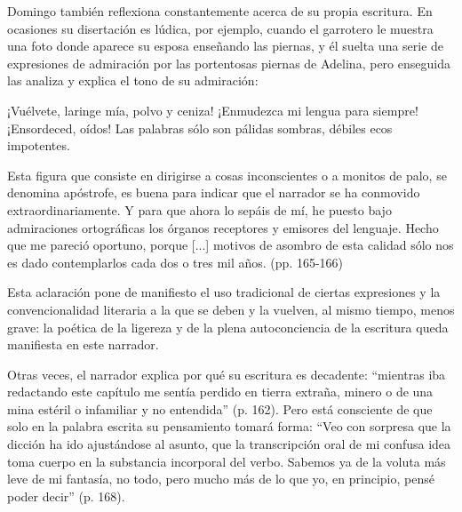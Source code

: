 \documentclass[14pt,twoside,final]{extbook} %
\begin{document}
Domingo también reflexiona constantemente acerca de su propia escritura. En ocasiones su disertación es lúdica, por ejemplo, cuando el garrotero le muestra una foto donde aparece su esposa enseñando las piernas, y él suelta una serie de expresiones de admiración por las portentosas piernas de Adelina, pero enseguida las analiza y explica el tono de su admiración:
\begin{quoting}
¡Vuélvete, laringe mía, polvo y ceniza! ¡Enmudezca mi lengua para siempre! ¡Ensordeced, oídos! Las palabras sólo son pálidas sombras, débiles ecos impotentes.

Esta figura que consiste en dirigirse a cosas inconscientes o a monitos de palo, se denomina apóstrofe, es buena para indicar que el narrador se ha conmovido extraordinariamente. Y para que ahora lo sepáis de mí, he puesto bajo admiraciones ortográficas los órganos receptores y emisores del lenguaje. Hecho que me pareció oportuno, porque [...] motivos de asombro de esta calidad sólo nos es dado contemplarlos cada dos o tres mil años. (pp. 165-166)
\end{quoting}
Esta aclaración pone de manifiesto el uso tradicional de ciertas expresiones y la convencionalidad literaria a la que se deben y la vuelven, al mismo tiempo, menos grave: la poética de la ligereza y de la plena autoconciencia de la escritura queda manifiesta en este narrador.

Otras veces, el narrador explica por qué su escritura es decadente: ``mientras iba redactando este capítulo me sentía perdido en tierra extraña, minero o de una mina estéril o infamiliar y no entendida'' (p. 162). Pero está consciente de que solo en la palabra escrita su pensamiento tomará forma: ``Veo con sorpresa que la dicción ha ido ajustándose al asunto, que la transcripción oral de mi confusa idea toma cuerpo en la substancia incorporal del verbo. Sabemos ya de la voluta más leve de mi fantasía, no todo, pero mucho más de lo que yo, en principio, pensé poder decir'' (p. 168).
\end{document}
